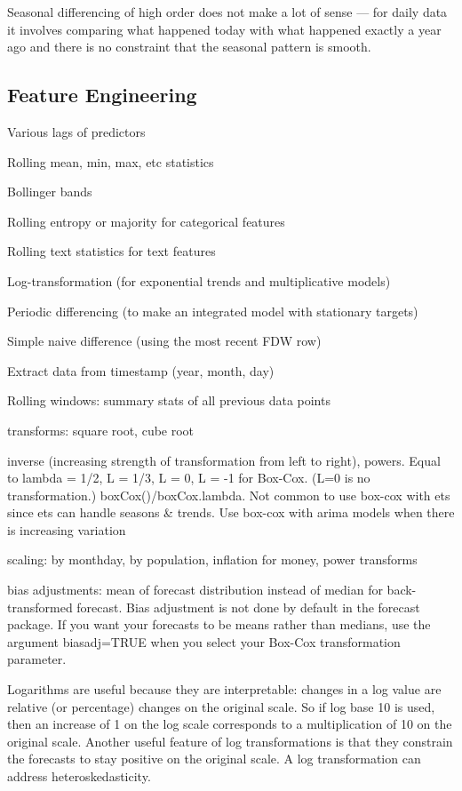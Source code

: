 \documentclass[]{book}
\begin{document}
Seasonal differencing of high order does not make a lot of sense --- for
daily data it involves comparing what happened today with what happened
exactly a year ago and there is no constraint that the seasonal pattern
is smooth.

\subsection{Feature Engineering}\label{feature-engineering-1}

Various lags of predictors

Rolling mean, min, max, etc statistics

Bollinger bands

Rolling entropy or majority for categorical features

Rolling text statistics for text features

Log-transformation (for exponential trends and multiplicative models)

Periodic differencing (to make an integrated model with stationary
targets)

Simple naive difference (using the most recent FDW row)

Extract data from timestamp (year, month, day)

Rolling windows: summary stats of all previous data points

transforms: square root, cube root

inverse (increasing strength of transformation from left to right),
powers. Equal to lambda = 1/2, L = 1/3, L = 0, L = -1 for Box-Cox. (L=0
is no transformation.) boxCox()/boxCox.lambda. Not common to use box-cox
with ets since ets can handle seasons \& trends. Use box-cox with arima
models when there is increasing variation

scaling: by monthday, by population, inflation for money, power
transforms

bias adjustments: mean of forecast distribution instead of median for
back-transformed forecast. Bias adjustment is not done by default in the
forecast package. If you want your forecasts to be means rather than
medians, use the argument biasadj=TRUE when you select your Box-Cox
transformation parameter.

Logarithms are useful because they are interpretable: changes in a log
value are relative (or percentage) changes on the original scale. So if
log base 10 is used, then an increase of 1 on the log scale corresponds
to a multiplication of 10 on the original scale. Another useful feature
of log transformations is that they constrain the forecasts to stay
positive on the original scale. A log transformation can address
heteroskedasticity.
\end{document}
